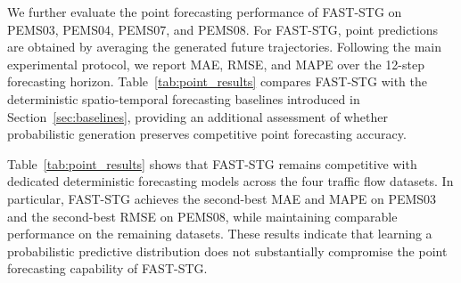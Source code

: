 \documentclass[sigconf, anonymous, review]{acmart}
\begin{document}
We further evaluate the point forecasting performance of FAST-STG on
PEMS03, PEMS04, PEMS07, and PEMS08. For FAST-STG, point predictions are
obtained by averaging the generated future trajectories. Following the
main experimental protocol, we report MAE, RMSE, and MAPE over the
12-step forecasting horizon. Table~\ref{tab:point_results} compares
FAST-STG with the deterministic spatio-temporal forecasting baselines
introduced in Section~\ref{sec:baselines}, providing an additional
assessment of whether probabilistic generation preserves competitive
point forecasting accuracy.

Table~\ref{tab:point_results} shows that FAST-STG remains competitive
with dedicated deterministic forecasting models across the four
traffic flow datasets. In particular, FAST-STG achieves the second-best
MAE and MAPE on PEMS03 and the second-best RMSE on PEMS08, while
maintaining comparable performance on the remaining datasets. These
results indicate that learning a probabilistic predictive distribution
does not substantially compromise the point forecasting capability of
FAST-STG.
\end{document}

